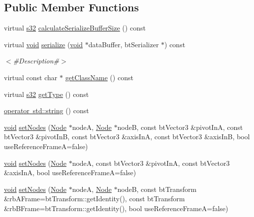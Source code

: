\subsection*{Public Member Functions}
\begin{DoxyCompactItemize}
\item 
virtual \mbox{\hyperlink{_util_8h_aa62c75d314a0d1f37f79c4b73b2292e2}{s32}} \mbox{\hyperlink{classnjli_1_1_physics_constraint_hinge_abdace027e8450d8962cbde115496b097}{calculate\+Serialize\+Buffer\+Size}} () const
\item 
virtual \mbox{\hyperlink{_thread_8h_af1e856da2e658414cb2456cb6f7ebc66}{void}} \mbox{\hyperlink{classnjli_1_1_physics_constraint_hinge_ab3af6e3d64bf17cdf5cef687df03cdda}{serialize}} (\mbox{\hyperlink{_thread_8h_af1e856da2e658414cb2456cb6f7ebc66}{void}} $\ast$data\+Buffer, bt\+Serializer $\ast$) const
\begin{DoxyCompactList}\small\item\em $<$\#\+Description\#$>$ \end{DoxyCompactList}\item 
virtual const char $\ast$ \mbox{\hyperlink{classnjli_1_1_physics_constraint_hinge_a30edeca9b74147307de1440a37dac556}{get\+Class\+Name}} () const
\item 
virtual \mbox{\hyperlink{_util_8h_aa62c75d314a0d1f37f79c4b73b2292e2}{s32}} \mbox{\hyperlink{classnjli_1_1_physics_constraint_hinge_ae31ea0358f051f773a4f06b52f6c92ff}{get\+Type}} () const
\item 
\mbox{\hyperlink{classnjli_1_1_physics_constraint_hinge_a47473ae8529b6502ac247189af9a0a10}{operator std\+::string}} () const
\item 
\mbox{\hyperlink{_thread_8h_af1e856da2e658414cb2456cb6f7ebc66}{void}} \mbox{\hyperlink{classnjli_1_1_physics_constraint_hinge_a5c4c4f472b136fadfa394109a8ae9e49}{set\+Nodes}} (\mbox{\hyperlink{classnjli_1_1_node}{Node}} $\ast$nodeA, \mbox{\hyperlink{classnjli_1_1_node}{Node}} $\ast$nodeB, const bt\+Vector3 \&pivot\+InA, const bt\+Vector3 \&pivot\+InB, const bt\+Vector3 \&axis\+InA, const bt\+Vector3 \&axis\+InB, bool use\+Reference\+FrameA=false)
\item 
\mbox{\hyperlink{_thread_8h_af1e856da2e658414cb2456cb6f7ebc66}{void}} \mbox{\hyperlink{classnjli_1_1_physics_constraint_hinge_a388cc9189f0c78a9587b706ea6b8ae78}{set\+Nodes}} (\mbox{\hyperlink{classnjli_1_1_node}{Node}} $\ast$nodeA, const bt\+Vector3 \&pivot\+InA, const bt\+Vector3 \&axis\+InA, bool use\+Reference\+FrameA=false)
\item 
\mbox{\hyperlink{_thread_8h_af1e856da2e658414cb2456cb6f7ebc66}{void}} \mbox{\hyperlink{classnjli_1_1_physics_constraint_hinge_af0950830b79cb1999d47bf8185c72e34}{set\+Nodes}} (\mbox{\hyperlink{classnjli_1_1_node}{Node}} $\ast$nodeA, \mbox{\hyperlink{classnjli_1_1_node}{Node}} $\ast$nodeB, const bt\+Transform \&rb\+A\+Frame=bt\+Transform\+::get\+Identity(), const bt\+Transform \&rb\+B\+Frame=bt\+Transform\+::get\+Identity(), bool use\+Reference\+FrameA=false)

\end{DoxyCompactItemize}
